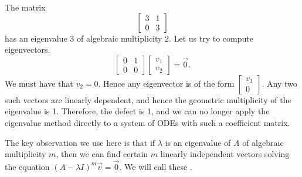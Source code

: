 \documentclass[12pt]{book}
\begin{document}
\begin{example}
The matrix
\begin{equation*}
\begin{bmatrix}
3 & 1 \\ 0 & 3
\end{bmatrix}
\end{equation*}
has an eigenvalue 3 of algebraic multiplicity 2.
Let us try to compute eigenvectors.
\begin{equation*}
\begin{bmatrix}
0 & 1 \\ 0 & 0
\end{bmatrix}
\begin{bmatrix}
v_1 \\ v_2
\end{bmatrix}
= \vec{0} .
\end{equation*}
We must have that $v_2 = 0$.  Hence any eigenvector is of the form
$\left[ \begin{smallmatrix} v_1 \\ 0 \end{smallmatrix} \right]$.  Any two
such vectors are linearly dependent, and hence the geometric multiplicity
of the eigenvalue is 1.  Therefore, the defect is 1, and we can no longer
apply the eigenvalue method directly to a system of ODEs with such a
coefficient matrix.

\medskip

The key observation we use here is that
if $\lambda$ is an eigenvalue of $A$ of algebraic multiplicity $m$,
then we can find certain $m$ linearly independent vectors
solving the equation ${(A-\lambda I)}^m \vec{v} = \vec{0}$.  We will
call these \emph{}.

\medskip


\end{example}
\end{document}
